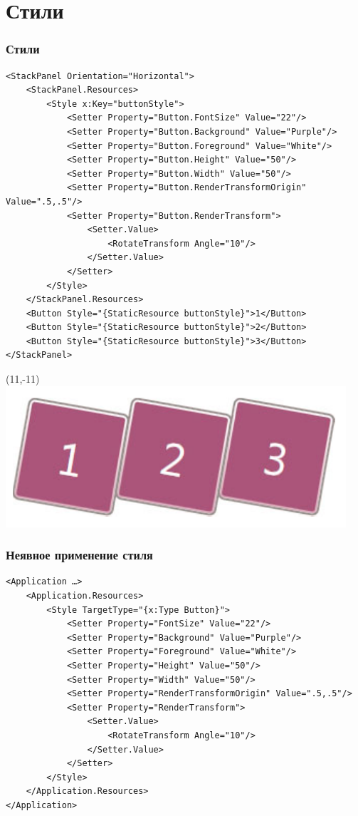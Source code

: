 \documentclass[xetex,mathserif,serif]{beamer}
\begin{document}
	\section{Стили}

	\begin{frame}[fragile]
		\frametitle{Стили}
		\begin{scriptsize}
			\begin{verbatim}
<StackPanel Orientation="Horizontal">
    <StackPanel.Resources>
        <Style x:Key="buttonStyle">
            <Setter Property="Button.FontSize" Value="22"/>
            <Setter Property="Button.Background" Value="Purple"/>
            <Setter Property="Button.Foreground" Value="White"/>
            <Setter Property="Button.Height" Value="50"/>
            <Setter Property="Button.Width" Value="50"/>
            <Setter Property="Button.RenderTransformOrigin" Value=".5,.5"/>
            <Setter Property="Button.RenderTransform">
                <Setter.Value>
                    <RotateTransform Angle="10"/>
                </Setter.Value>
            </Setter>
        </Style>
    </StackPanel.Resources>
    <Button Style="{StaticResource buttonStyle}">1</Button>
    <Button Style="{StaticResource buttonStyle}">2</Button>
    <Button Style="{StaticResource buttonStyle}">3</Button>
</StackPanel> 
			\end{verbatim}
		\end{scriptsize}
		\begin{textblock}{3}(11,-11)
			\includegraphics[width=\textwidth]{buttons.png}
		\end{textblock}
	\end{frame}

	\begin{frame}[fragile]
		\frametitle{Неявное применение стиля}
		\begin{scriptsize}
			\begin{verbatim}
<Application …>
    <Application.Resources>
        <Style TargetType="{x:Type Button}">
            <Setter Property="FontSize" Value="22"/>
            <Setter Property="Background" Value="Purple"/>
            <Setter Property="Foreground" Value="White"/>
            <Setter Property="Height" Value="50"/>
            <Setter Property="Width" Value="50"/>
            <Setter Property="RenderTransformOrigin" Value=".5,.5"/>
            <Setter Property="RenderTransform">
                <Setter.Value>
                    <RotateTransform Angle="10"/>
                </Setter.Value>
            </Setter>
        </Style>
    </Application.Resources>
</Application>
			\end{verbatim}
		\end{scriptsize}
	\end{frame}
\end{document}
